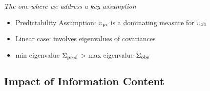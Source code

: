\begin{frame}{\it The one where we address a key assumption}

\begin{itemize}
\item Predictability Assumption: $\operatorname*{\pi_{pr}}$ is a dominating measure for $\operatorname*{\pi_{ob}}$
\item Linear case: involves eigenvalues of covariances
\item min eigenvalue $\Sigma_\text{pred}$ > max eigenvalue $\Sigma_\text{obs}$
\end{itemize}

\end{frame}

\subsection{Impact of Information Content}

